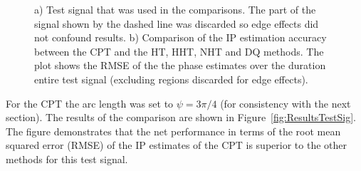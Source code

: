 \documentclass[a4paper]{IEEEtran}
\begin{document}
\begin{figure}[ht]
	\centering
	\caption{a) Test signal that was used in the comparisons. The part of the signal shown by the dashed line was discarded so edge effects did not confound results. b) Comparison of the IP estimation accuracy between the CPT and the HT, HHT, NHT and DQ methods. The plot shows the RMSE of the the phase estimates over the duration entire test signal (excluding regions discarded for edge effects).}
\end{figure}

For the CPT the arc length was set to $\psi=3\pi/4$ (for consistency with the next section). The results of the comparison are shown in Figure~\ref{fig:ResultsTestSig}. The figure demonstrates that the net performance in terms of the root mean squared error (RMSE) of the IP estimates of the CPT is superior to the other methods for this test signal.
\end{document}
